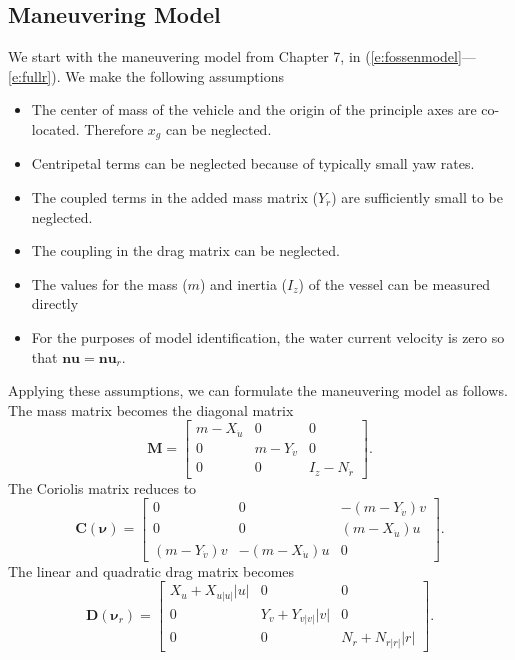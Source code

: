 \documentclass[11pt,draftcls,journal,onecolumn]{IEEEtran}
\begin{document}
\subsection{Maneuvering Model}
We start with the maneuvering model from \cite{fossen11handbook} Chapter 7, in (\ref{e:fossenmodel}---\ref{e:fullr}).  We make the following assumptions
\begin{itemize}
\item The center of mass of the vehicle and the origin of the principle axes are co-located.  Therefore $x_g$ can be neglected.
\item Centripetal terms can be neglected because of typically small yaw rates.
\item The coupled terms in the added mass matrix ($Y_{\dot{r}}$) are sufficiently small to be neglected.
\item The coupling in the drag matrix can be neglected.
\item The values for the mass ($m$) and inertia ($I_z$) of the vessel can be measured directly
\item For the purposes of model identification, the water current velocity is zero so that $\bm{nu}=\bm{nu}_r$.
\end{itemize}
Applying these assumptions, we can formulate the maneuvering model as follows.  The mass matrix becomes the diagonal matrix
\begin{equation}
\bm{M}= \left[ 
\begin{array}{ccc}
m-X_{\dot{u}} & 0 & 0 \\
0 & m-Y_{\dot{v}} & 0 \\
0 & 0 & I_z-N_{\dot{r}} 
\end{array} \right].
\end{equation}
The Coriolis matrix reduces to 
\begin{equation}
\bm{C}(\bm{\nu})= \left[ 
\begin{array}{ccc}
0 & 0 & -(m-Y_{\dot{v}})v \\
0 & 0 & (m-X_{\dot{u}})u \\
(m-Y_{\dot{v}})v & -(m-X_{\dot{u}})u  & 0 
\end{array} \right].
\end{equation}
The linear and quadratic drag matrix becomes
\begin{equation}
\bm{D}(\bm{\nu}_r)= \left[ 
\begin{array}{ccc}
X_u + X_{u|u|}|u| & 0 & 0 \\
0 & Y_v + Y_{v|v|}|v| & 0 \\
0 & 0  & N_r+N_{r|r|}|r|
\end{array} \right].
\end{equation}
\end{document}
